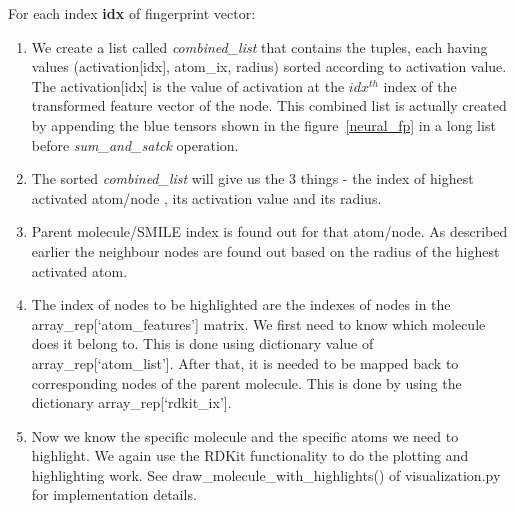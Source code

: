 \documentclass[10pt,a4paper,Times new roman]{report}
\begin{document}
For each index \textbf{idx} of fingerprint vector:
\begin{enumerate}
\item  We create a list called \textit{combined\_list} that contains the tuples, each having values (activation[idx], atom\_ix, radius) sorted according to activation value. The activation[idx] is the value of activation at the $idx^{th}$ index of the transformed feature vector of the node. This combined list is actually created by appending the blue tensors shown in the figure~\ref{neural_fp} in a long list before \textit{sum\_and\_satck} operation.

\item The sorted \textit{combined\_list} will give us the 3 things - the index of highest activated atom/node , its activation value and its radius.

\item Parent molecule/SMILE index is found out for that atom/node. As described earlier the neighbour nodes are found out based on the radius of the highest activated atom.

\item The index of nodes to be highlighted are the indexes of nodes in the array\_rep[`atom\_features'] matrix. We first need to know which molecule does it belong to. This is done using dictionary value of array\_rep[`atom\_list'].  After that, it is needed to be mapped back to corresponding nodes of the parent molecule. This is done by using the dictionary array\_rep[`rdkit\_ix'].

\item Now we know the specific molecule and the specific atoms we need to highlight. We again use the RDKit functionality to do the plotting  and highlighting work. See draw\_molecule\_with\_highlights() of visualization.py for implementation details.

\end{enumerate}


\end{document}
